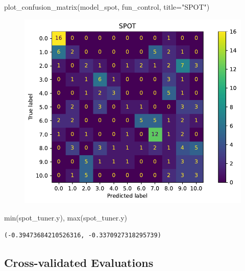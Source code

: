 \documentclass[
  letterpaper,
  DIV=11,
  numbers=noendperiod]{scrreprt}
\newenvironment{Shaded}{\begin{snugshade}}{\end{snugshade}}
\newcommand{\BuiltInTok}[1]{\textcolor[rgb]{0.00,0.23,0.31}{#1}}
\newcommand{\NormalTok}[1]{\textcolor[rgb]{0.00,0.23,0.31}{#1}}
\newcommand{\OperatorTok}[1]{\textcolor[rgb]{0.37,0.37,0.37}{#1}}
\newcommand{\StringTok}[1]{\textcolor[rgb]{0.13,0.47,0.30}{#1}}
\begin{document}
\begin{Shaded}
\begin{Highlighting}[]
\NormalTok{plot\_confusion\_matrix(model\_spot, fun\_control, title}\OperatorTok{=}\StringTok{"SPOT"}\NormalTok{)}
\end{Highlighting}
\end{Shaded}

\begin{figure}[H]

{\centering \includegraphics{18_spot_hpt_sklearn_multiclass_classification_svc_files/figure-pdf/cell-43-output-1.pdf}

}

\end{figure}

\begin{Shaded}
\begin{Highlighting}[]
\BuiltInTok{min}\NormalTok{(spot\_tuner.y), }\BuiltInTok{max}\NormalTok{(spot\_tuner.y)}
\end{Highlighting}
\end{Shaded}

\begin{verbatim}
(-0.39473684210526316, -0.3370927318295739)
\end{verbatim}

\hypertarget{cross-validated-evaluations-2}{%
\subsection{Cross-validated
Evaluations}\label{cross-validated-evaluations-2}}
\end{document}
